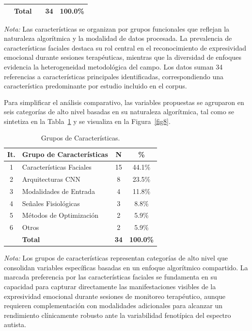 \documentclass[3p,twocolumn,times]{elsarticle}
\begin{document}
\begin{table}[t]
\begin{tabular}{cllcc}
			& \textbf{Total}           &                                           & \textbf{34} & \textbf{100.0\%} \\
			\bottomrule
		\end{tabular}
		\begin{minipage}{\textwidth}
			\vspace{6pt}
			\small\textit{Nota:} Las características se organizan por grupos funcionales que
			reflejan la naturaleza algorítmica y la modalidad de datos procesada. La prevalencia
			de características faciales destaca su rol central en el reconocimiento de
			expresividad emocional durante sesiones terapéuticas, mientras que la diversidad de
			enfoques evidencia la heterogeneidad metodológica del campo. Los datos suman 34
			referencias a características principales identificadas, correspondiendo una
			característica predominante por estudio incluido en el corpus.
		\end{minipage}
	\end{table}
	
	Para simplificar el análisis comparativo, las variables propuestas se agruparon en
	seis categorías de alto nivel basadas en su naturaleza algorítmica, tal como se
	sintetiza en la Tabla~\ref{tab12} y se visualiza en la Figura~\ref{fig8}.
	
	\begin{table}[t]
		\centering
		\caption{Grupos de Características.}\label{tab12}
		\begin{tabular}{clcc}
			\toprule
			\textbf{It.} & \textbf{Grupo de Características} & \textbf{N} & \textbf{\%} \\
			\midrule
			1 & Características Faciales  & 15 & 44.1\% \\
			2 & Arquitecturas CNN         & 8  & 23.5\% \\
			3 & Modalidades de Entrada    & 4  & 11.8\% \\
			4 & Señales Fisiológicas      & 3  & 8.8\%  \\
			5 & Métodos de Optimización   & 2  & 5.9\%  \\
			6 & Otros                     & 2  & 5.9\%  \\
			& \textbf{Total}            & \textbf{34} & \textbf{100.0\%} \\
			\bottomrule
		\end{tabular}
		\begin{minipage}{\columnwidth}
			\vspace{6pt}
			\small\textit{Nota:} Los grupos de características representan categorías de alto
			nivel que consolidan variables específicas basadas en un enfoque algorítmico
			compartido. La marcada preferencia por las características faciales se fundamenta
			en su capacidad para capturar directamente las manifestaciones visibles de la
			expresividad emocional durante sesiones de monitoreo terapéutico, aunque requieren
			complementación con modalidades adicionales para alcanzar un rendimiento clínicamente
			robusto ante la variabilidad fenotípica del espectro autista.
		\end{minipage}
	\end{table}
	
\end{document}
